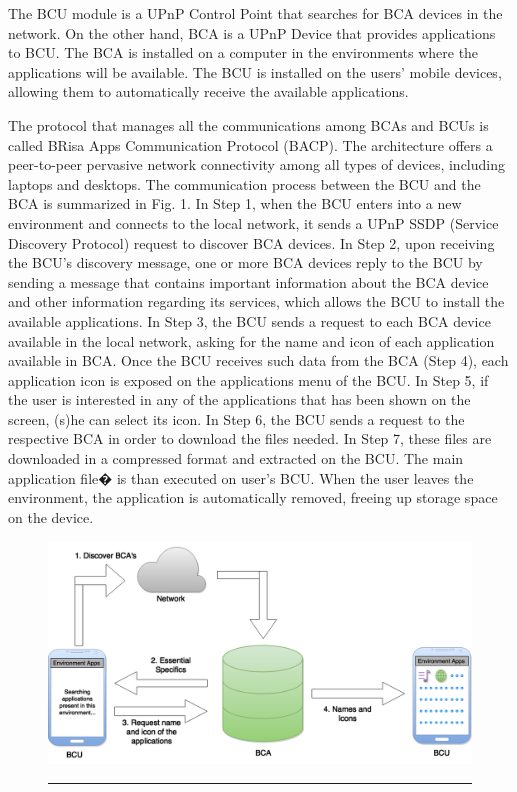 \documentclass[journal]{IEEEtran}
\begin{document}
The BCU module is a UPnP Control Point that searches for BCA devices in the network. On the other hand, BCA is a UPnP Device that provides applications to BCU. The BCA is installed on a computer in the environments where the applications will be available. The BCU is installed on the users' mobile devices, allowing them to automatically receive the available applications.

The protocol that manages all the communications among BCAs and BCUs is called BRisa Apps Communication Protocol (BACP). The architecture offers a peer-to-peer pervasive network connectivity among all types of devices, including laptops and desktops. The communication process between the BCU and the BCA is summarized in Fig. 1. In Step 1, when the BCU enters into a new environment and connects to the local network, it sends a UPnP SSDP (Service Discovery Protocol) request to discover BCA devices. In Step 2, upon receiving the BCU's discovery message, one or more BCA devices reply to the BCU by sending a message that contains important information about the BCA device and other information regarding its services, which allows the BCU to install the available applications. In Step 3, the BCU sends a request to each BCA device available in the local network, asking for the name and icon of each application available in BCA. Once the BCU receives such data from the BCA (Step 4), each application icon is exposed on the applications menu of the BCU. In Step 5, if the user is interested in any of the applications that has been shown on the screen, (s)he can select its icon. In Step 6, the BCU sends a request to the respective BCA in order to download the files needed. In Step 7, these files are downloaded in a compressed format and extracted on the BCU. The main application file� is than executed on user's BCU. When the user leaves the environment, the application is automatically removed, freeing up storage space on the device.

\begin{figure}[tb]
    \includegraphics[scale = 0.26]{FIG1}    
    \rule[1ex]{10cm}{0.5pt}
\end{figure}
\end{document}
